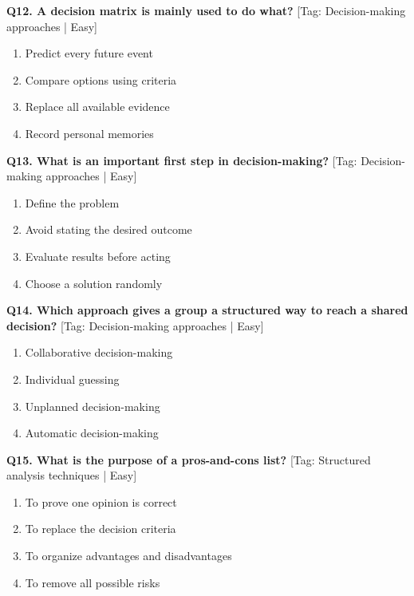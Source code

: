 \noindent\textbf{Q12. A decision matrix is mainly used to do what?} \hfill [Tag: Decision-making approaches | Easy]
\begin{enumerate}[label=(\alph*),topsep=2pt,itemsep=1pt,partopsep=0pt,parsep=0pt]
    \item {Predict every future event}
    \item {Compare options using criteria}
    \item {Replace all available evidence}
    \item {Record personal memories}
\end{enumerate}
\vspace{2mm}

\noindent\textbf{Q13. What is an important first step in decision-making?} \hfill [Tag: Decision-making approaches | Easy]
\begin{enumerate}[label=(\alph*),topsep=2pt,itemsep=1pt,partopsep=0pt,parsep=0pt]
    \item {Define the problem}
    \item {Avoid stating the desired outcome}
    \item {Evaluate results before acting}
    \item {Choose a solution randomly}
\end{enumerate}
\vspace{2mm}

\noindent\textbf{Q14. Which approach gives a group a structured way to reach a shared decision?} \hfill [Tag: Decision-making approaches | Easy]
\begin{enumerate}[label=(\alph*),topsep=2pt,itemsep=1pt,partopsep=0pt,parsep=0pt]
    \item {Collaborative decision-making}
    \item {Individual guessing}
    \item {Unplanned decision-making}
    \item {Automatic decision-making}
\end{enumerate}
\vspace{2mm}

\noindent\textbf{Q15. What is the purpose of a pros-and-cons list?} \hfill [Tag: Structured analysis techniques | Easy]
\begin{enumerate}[label=(\alph*),topsep=2pt,itemsep=1pt,partopsep=0pt,parsep=0pt]
    \item {To prove one opinion is correct}
    \item {To replace the decision criteria}
    \item {To organize advantages and disadvantages}
    \item {To remove all possible risks}
\end{enumerate}
\vspace{2mm}

